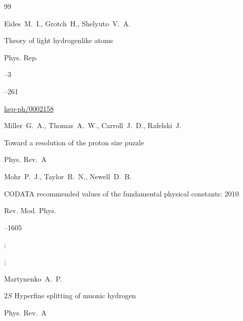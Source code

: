 \begin{thebibliography}{99}

\by Eides~M.~I., Grotch~H., Shelyuto~V.~A.

\paper Theory of light hydrogenlike atoms

\jour Phys. Rep.



--3

--261


\arxiv \href{http://arxiv.org/abs/hep-ph/0002158}{hep-ph/0002158}




\by Miller~G.~A., Thomas~A.~W., Carroll~J.~D., Rafelski~J.

\paper Toward a resolution of the proton size puzzle

\jour Phys. Rev.~A









\by Mohr~P.~J., Taylor~B.~N., Newell~D.~B.

\paper CODATA recommended values of the fundamental physical constants: 2010

\jour Rev. Mod. Phys.




--1605

;


;






\by Martynenko~A.~P.

\paper $2S$ Hyperfine splitting of muonic hydrogen

\jour Phys. Rev.~A




\end{thebibliography}
